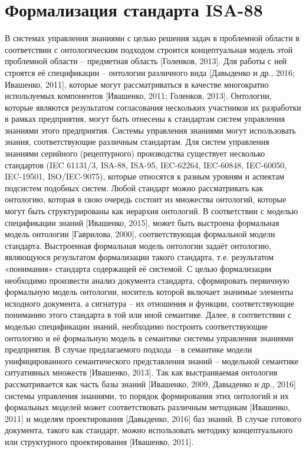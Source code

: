 \section{Формализация стандарта ISA-88}

В системах управления знаниями с целью решения задач в проблемной области в соответствии с онтологическим подходом строится концептуальная модель этой проблемной области – предметная область [Голенков, 2013]. Для работы с ней строятся её спецификации – онтологии различного вида [Давыденко и др., 2016; Ивашенко, 2011], которые могут рассматриваться в качестве многократно используемых компонентов [Ивашенко, 2011; Голенков, 2013]. Онтологии, которые являются результатом согласования нескольких участников их разработки в рамках предприятия, могут быть отнесены к стандартам систем управления знаниями этого предприятия.
Системы управления знаниями могут использовать знания, соответствующие различным стандартам. Для систем управления знаниями серийного (рецептурного) производства существует несколько стандартов (IEC 61131/3, ISA-88, ISA-95, IEC-62264, IEC-60848, IEC-60050, IEC-19501, ISO/IEC-9075), которые относятся к разным уровням и аспектам подсистем подобных систем.
Любой стандарт можно рассматривать как онтологию, которая в свою очередь состоит из множества онтологий, которые могут быть структурированы как иерархия онтологий. В соответствии с моделью спецификации знаний [Ивашенко, 2015], может быть выстроена формальная модель онтологии [Гаврилова, 2000], соответствующая формальной модели стандарта. Выстроенная формальная модель онтологии задаёт онтологию, являющуюся результатом формализации такого стандарта, т.е. результатом «понимания» стандарта содержащей её системой. С целью формализации необходимо произвести анализ документа стандарта, сформировать первичную формальную модель онтологии, носитель которой включает значимые элементы исходного документа, а сигнатура – их отношения и функции, соответствующие пониманию этого стандарта в той или иной семантике. Далее, в соответствии с моделью спецификации знаний, необходимо построить соответствующие онтологию и её формальную модель в семантике системы управления знаниями предприятия. В случае предлагаемого подхода – в семантике модели унифицированного семантического представления знаний – модельной семантике ситуативных множеств [Ивашенко, 2013]. Так как выстраиваемая онтология рассматривается как часть базы знаний [Ивашенко, 2009, Давыденко и др., 2016] системы управления знаниями, то порядок формирования этих онтологий и их формальных моделей может соответствовать различным методикам [Ивашенко, 2011] и моделям проектирования [Давыденко, 2016] баз знаний.
В случае готового документа, такого как стандарт, можно использовать методику концептуального или структурного проектирования [Ивашенко, 2011].

